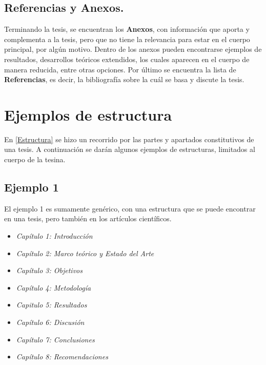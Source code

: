 
\subsection{Referencias y Anexos.}

Terminando la tesis, se encuentran  los \textbf{Anexos}, con información que aporta y complementa a la tesis, pero que no tiene la relevancia para estar en el cuerpo principal, por algún motivo. Dentro de los anexos pueden encontrarse ejemplos de resultados, desarrollos teóricos extendidos, los cuales aparecen en el cuerpo de manera reducida, entre otras opciones. Por último se encuentra la lista de \textbf{Referencias}, es decir, la bibliografía sobre la cuál se basa y discute la tesis.


\section{Ejemplos de estructura}

En \ref{Estructura} se hizo un recorrido por las partes y apartados constitutivos de una tesis. A continuación se darán algunos ejemplos de estructuras, limitados al cuerpo de la tesina.
\subsection{Ejemplo 1}
El ejemplo 1 es sumamente genérico, con una estructura que se puede encontrar en una tesis, pero también en los artículos científicos.

\begin{itemize}
	\item \textit{Capítulo 1: Introducción}
	\item \textit{Capítulo 2: Marco teórico y Estado del Arte}
	\item \textit{Capítulo 3: Objetivos}
	\item \textit{Capítulo 4: Metodología}
	\item \textit{Capitulo 5: Resultados}
	\item \textit{Capítulo 6: Discusión}
	\item \textit{Capítulo 7: Conclusiones}
	\item \textit{Capítulo 8: Recomendaciones}	

\end{itemize}
